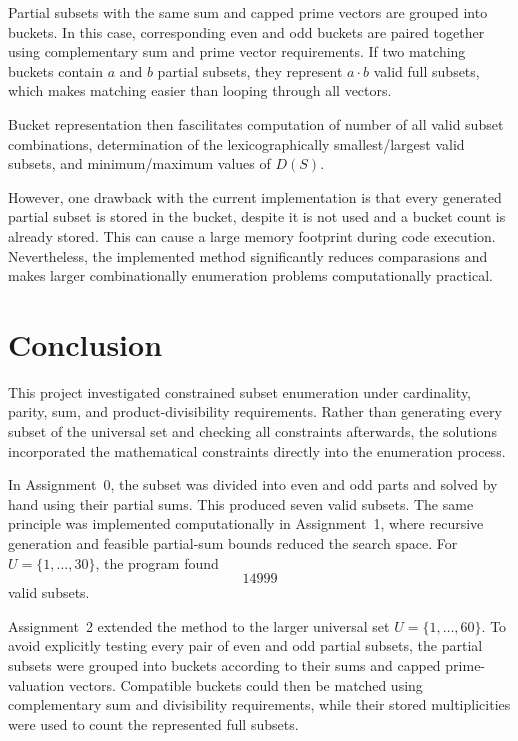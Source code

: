 \documentclass[11pt,a4paper]{article}
\begin{document}
Partial subsets with the same sum and capped prime vectors are grouped into buckets. In this case, corresponding even and odd buckets are paired together using complementary sum and prime vector requirements. If two matching buckets contain $a$ and $b$ partial subsets, they represent $a\cdot b$ valid full subsets, which makes matching easier than looping through all vectors.

Bucket representation then fascilitates computation of number of all valid subset combinations, determination of the lexicographically smallest/largest valid subsets, and minimum/maximum values of $D(S)$.

However, one drawback with the current implementation is that every generated partial subset is stored in the bucket, despite it is not used and a bucket count is already stored. This can cause a large memory footprint during code execution. Nevertheless, the implemented method significantly reduces comparasions and makes larger combinationally enumeration problems computationally practical.

\section*{Conclusion}


This project investigated constrained subset enumeration under cardinality,
parity, sum, and product-divisibility requirements. Rather than generating
every subset of the universal set and checking all constraints afterwards,
the solutions incorporated the mathematical constraints directly into the
enumeration process.

In Assignment~0, the subset was divided into even and odd parts and solved
by hand using their partial sums. This produced seven valid subsets. The same
principle was implemented computationally in Assignment~1, where recursive
generation and feasible partial-sum bounds reduced the search space. For
$U=\{1,\ldots,30\}$, the program found
\[
\boxed{14999}
\]
valid subsets.

Assignment~2 extended the method to the larger universal set
$U=\{1,\ldots,60\}$. To avoid explicitly testing every pair of even and odd
partial subsets, the partial subsets were grouped into buckets according to
their sums and capped prime-valuation vectors. Compatible buckets could then
be matched using complementary sum and divisibility requirements, while
their stored multiplicities were used to count the represented full subsets.
\end{document}
